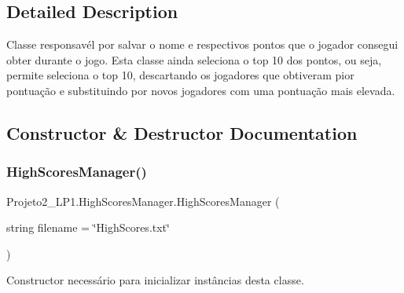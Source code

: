 \subsection{Detailed Description}
Classe responsavél por salvar o nome e respectivos pontos que o jogador consegui obter durante o jogo. Esta classe ainda seleciona o top 10 dos pontos, ou seja, permite seleciona o top 10, descartando os jogadores que obtiveram pior pontuação e substituindo por novos jogadores com uma pontuação mais elevada. 



\subsection{Constructor \& Destructor Documentation}
\mbox{\label{class_projeto2___l_p1_1_1_high_scores_manager_a3fe673d1f5965bdb24a8a6b69cb5de60}} 
\subsubsection{\texorpdfstring{High\+Scores\+Manager()}{HighScoresManager()}}
{\footnotesize\ttfamily Projeto2\+\_\+\+L\+P1.\+High\+Scores\+Manager.\+High\+Scores\+Manager (\begin{DoxyParamCaption}\item[{string}]{filename = {\ttfamily \char`\"{}HighScores.txt\char`\"{}} }\end{DoxyParamCaption})\hspace{0.3cm}{\ttfamily [inline]}}



Constructor necessário para inicializar instâncias desta classe. 


